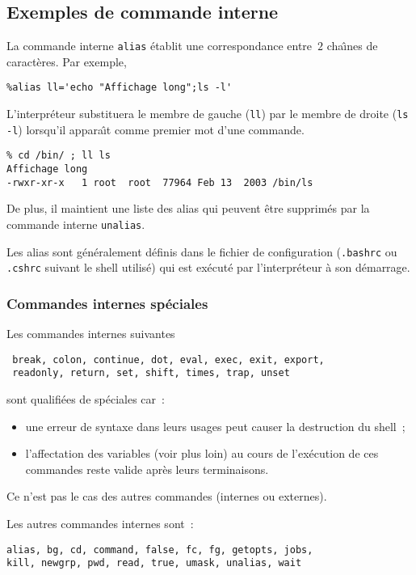\subsection{Exemples de commande interne}%
\begin{frame}[fragile]
  La commande interne \verb+alias+ \'etablit une correspondance entre~$2$
  cha\^\i{}nes de caract\`eres. Par exemple, 
\begin{verbatim}
%alias ll='echo "Affichage long";ls -l'
\end{verbatim}
  L'interpr\'eteur substituera le membre de gauche (\verb+ll+) par le
  membre de droite (\verb+ls -l+) lorsqu'il appara\^\i{}t comme
  premier mot d'une commande. 
\begin{verbatim}
% cd /bin/ ; ll ls
Affichage long
-rwxr-xr-x   1 root  root  77964 Feb 13  2003 /bin/ls
\end{verbatim}
  De plus, il maintient une liste des alias qui peuvent \^etre
  supprim\'es par la commande interne \verb+unalias+.
  \par  
  Les alias sont g\'en\'eralement d\'efinis dans le fichier de
  configuration (\verb+.bashrc+ ou \verb+.cshrc+ suivant le shell
  utilis\'e) qui est ex\'ecut\'e par l'interpr\'eteur \`a son
  d\'emarrage.
\end{frame}
\begin{frame}[fragile]
  \frametitle{Commandes internes sp\'eciales}
  Les commandes internes suivantes
\begin{verbatim}
 break, colon, continue, dot, eval, exec, exit, export,
 readonly, return, set, shift, times, trap, unset
\end{verbatim}
  sont qualifi\'ees de sp\'eciales car~:
  \begin{itemize}
  \item une erreur de syntaxe dans leurs usages peut causer la
    destruction du shell~;
  \item l'affectation des variables (voir plus loin) au cours de
    l'ex\'ecution de ces commandes reste valide apr\`es leurs
    terminaisons.
  \end{itemize}
  Ce n'est pas le cas des autres commandes (internes ou externes).
  \par\medskip
  Les autres commandes internes sont~:
\begin{verbatim}
alias, bg, cd, command, false, fc, fg, getopts, jobs, 
kill, newgrp, pwd, read, true, umask, unalias, wait
\end{verbatim}
\end{frame}

